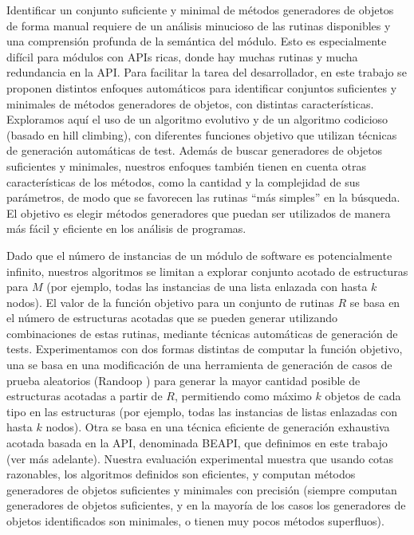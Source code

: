 Identificar un conjunto suficiente y minimal de métodos generadores de objetos de forma manual requiere de un análisis minucioso de las rutinas disponibles y una comprensión profunda de la semántica del módulo. Esto es especialmente difícil para módulos con APIs ricas, donde hay muchas rutinas y mucha redundancia en la API. Para facilitar la tarea del desarrollador, en este trabajo se proponen distintos enfoques automáticos para identificar conjuntos suficientes y minimales de métodos generadores de objetos, con distintas características. Exploramos aquí el uso de un algoritmo evolutivo y de un algoritmo codicioso (basado en hill climbing), con diferentes funciones objetivo que utilizan técnicas de generación automáticas de test. Además de buscar generadores de objetos suficientes y minimales, nuestros enfoques también tienen en cuenta otras características de los métodos, como la cantidad y la complejidad de sus parámetros, de modo que se favorecen las rutinas “más simples” en la búsqueda. El objetivo es elegir métodos generadores que puedan ser utilizados de manera más fácil y eficiente en los análisis de programas.

Dado que el número de instancias de un módulo de software es potencialmente infinito,
nuestros algoritmos se limitan a explorar conjunto acotado de estructuras para \(M\) \cite{Boyapati02} (por ejemplo, todas las instancias de una lista enlazada con hasta \(k\) nodos). El valor de la función objetivo para un conjunto de rutinas \(R\) se basa en el número de estructuras acotadas que se pueden generar utilizando combinaciones de estas rutinas, mediante técnicas automáticas de generación de tests. Experimentamos con dos formas distintas de computar la función objetivo, una se basa en una modificación de una herramienta de generación de casos de prueba aleatorios (Randoop \cite{ref24}) para generar la mayor cantidad posible de estructuras acotadas a partir de \(R\), permitiendo como máximo \(k\) objetos de cada tipo en las estructuras (por ejemplo, todas las instancias de listas enlazadas con hasta \(k\) nodos).  Otra se basa en una técnica eficiente de generación exhaustiva acotada basada en la API, denominada BEAPI, que definimos en este trabajo (ver más adelante).
Nuestra evaluación experimental muestra que usando cotas razonables, los algoritmos definidos son eficientes, y computan métodos generadores de objetos suficientes y minimales con precisión (siempre computan generadores de objetos suficientes, y en la mayoría de los casos los generadores de objetos identificados son minimales, o tienen muy pocos métodos superfluos).


